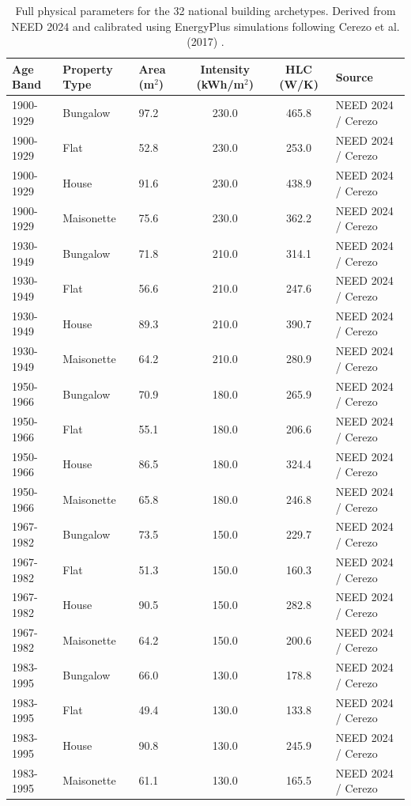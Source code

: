 \documentclass[11pt, a4paper, twocolumn]{article}
\begin{document}
\begin{table}[t]
\centering
\caption{Full physical parameters for the 32 national building archetypes. Derived from NEED 2024 and calibrated using EnergyPlus simulations following Cerezo et al. (2017) \cite{Cerezo2017}.} \label{tab:archetypes}
\begin{tabular}{lllccl}
\toprule
Age Band & Property Type & Area (m$^2$) & Intensity (kWh/m$^2$) & HLC (W/K) & Source \\
\midrule
1900-1929 & Bungalow & 97.2 & 230.0 & 465.8 & NEED 2024 / Cerezo \\
1900-1929 & Flat & 52.8 & 230.0 & 253.0 & NEED 2024 / Cerezo \\
1900-1929 & House & 91.6 & 230.0 & 438.9 & NEED 2024 / Cerezo \\
1900-1929 & Maisonette & 75.6 & 230.0 & 362.2 & NEED 2024 / Cerezo \\
1930-1949 & Bungalow & 71.8 & 210.0 & 314.1 & NEED 2024 / Cerezo \\
1930-1949 & Flat & 56.6 & 210.0 & 247.6 & NEED 2024 / Cerezo \\
1930-1949 & House & 89.3 & 210.0 & 390.7 & NEED 2024 / Cerezo \\
1930-1949 & Maisonette & 64.2 & 210.0 & 280.9 & NEED 2024 / Cerezo \\
1950-1966 & Bungalow & 70.9 & 180.0 & 265.9 & NEED 2024 / Cerezo \\
1950-1966 & Flat & 55.1 & 180.0 & 206.6 & NEED 2024 / Cerezo \\
1950-1966 & House & 86.5 & 180.0 & 324.4 & NEED 2024 / Cerezo \\
1950-1966 & Maisonette & 65.8 & 180.0 & 246.8 & NEED 2024 / Cerezo \\
1967-1982 & Bungalow & 73.5 & 150.0 & 229.7 & NEED 2024 / Cerezo \\
1967-1982 & Flat & 51.3 & 150.0 & 160.3 & NEED 2024 / Cerezo \\
1967-1982 & House & 90.5 & 150.0 & 282.8 & NEED 2024 / Cerezo \\
1967-1982 & Maisonette & 64.2 & 150.0 & 200.6 & NEED 2024 / Cerezo \\
1983-1995 & Bungalow & 66.0 & 130.0 & 178.8 & NEED 2024 / Cerezo \\
1983-1995 & Flat & 49.4 & 130.0 & 133.8 & NEED 2024 / Cerezo \\
1983-1995 & House & 90.8 & 130.0 & 245.9 & NEED 2024 / Cerezo \\
1983-1995 & Maisonette & 61.1 & 130.0 & 165.5 & NEED 2024 / Cerezo \\

\end{tabular}
\end{table}
\end{document}
